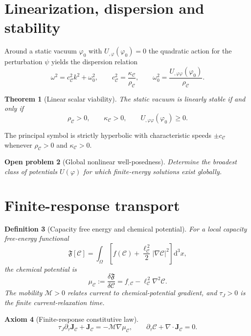 \documentclass[11pt,a4paper]{article}
\newtheorem{axiom}{Axiom}[section]
\newtheorem{definition}[axiom]{Definition}
\newtheorem{theorem}[axiom]{Theorem}
\newtheorem{openproblem}[axiom]{Open problem}
\newcommand{\C}{\mathcal{C}}
\newcommand{\Jc}{\mathbf{J}_{\mathcal{C}}}
\renewcommand{\dd}{\mathrm{d}}
\newcommand{\rhoC}{\rho_{\mathcal{C}}}
\newcommand{\kC}{\kappa_{\mathcal{C}}}
\newcommand{\Boxed}[1]{\boxed{\displaystyle #1}}
\begin{document}
\section{Linearization, dispersion and stability}

Around a static vacuum \(\varphi_0\) with \(U_{,\varphi}(\varphi_0)=0\) the quadratic action for the perturbation \(\psi\) yields the dispersion relation
\[
\omega^2=c_{\mathcal{C}}^2k^2+\omega_0^2,\qquad
c_{\mathcal{C}}^2=\frac{\kC}{\rhoC},\qquad
\omega_0^2=\frac{U_{,\varphi\varphi}(\varphi_0)}{\rhoC}.
\]

\begin{theorem}[Linear scalar viability]
The static vacuum is linearly stable if and only if
\[
\Boxed{\rhoC>0,\qquad\kC>0,\qquad U_{,\varphi\varphi}(\varphi_0)\ge0.}
\]
\end{theorem}

The principal symbol is strictly hyperbolic with characteristic speeds \(\pm c_{\mathcal{C}}\) whenever \(\rhoC>0\) and \(\kC>0\).

\begin{openproblem}[Global nonlinear well-posedness]
Determine the broadest class of potentials \(U(\varphi)\) for which finite-energy solutions exist globally.
\end{openproblem}

\section{Finite-response transport}

\begin{definition}[Capacity free energy and chemical potential]
For a local capacity free-energy functional
\[
\mathfrak F[\C]
=
\int_\Omega
\left[
f(\C)+\frac{\ell_{\mathcal C}^{\,2}}{2}|\nabla\C|^2
\right]\dd^3x,
\]
the chemical potential is
\[
\mu_{\mathcal C}
:=
\frac{\delta\mathfrak F}{\delta\C}
=
f_{,\C}-\ell_{\mathcal C}^{\,2}\nabla^2\C .
\]
The mobility \(\mathcal M>0\) relates current to chemical-potential gradient,
and \(\tau_J>0\) is the finite current-relaxation time.
\end{definition}

\begin{axiom}[Finite-response constitutive law]
\[
\tau_J\partial_\tau\Jc+\Jc=-\mathcal M\nabla\mu_{\mathcal C},
\qquad
\partial_\tau\C+\nabla\cdot\Jc=0.
\]
\end{axiom}
\end{document}
